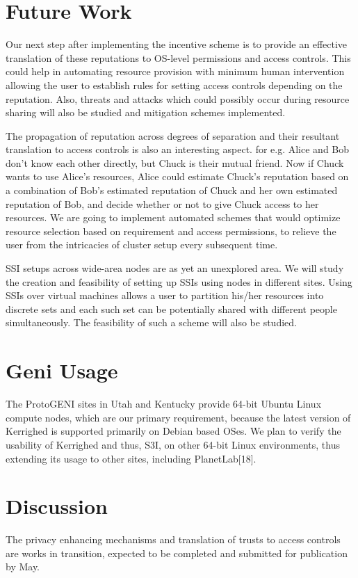 \documentclass[10pt, conference, compsocconf]{IEEEtran}
\begin{document}
\section{Future Work}
\label{sec:Future Work}
Our next step after implementing the incentive scheme
is to provide an effective translation of these reputations
to OS-level permissions and access controls. This could
help in automating resource provision with minimum human
intervention allowing the user to establish rules for
setting access controls depending on the reputation.
Also, threats and attacks which could possibly
occur during resource sharing will also be studied and
mitigation schemes implemented.

The propagation of reputation across degrees of separation
and their resultant translation to access controls is also
an interesting aspect. for e.g. Alice and Bob don’t know
each other directly, but Chuck is their mutual friend.
Now if Chuck wants to use Alice's resources, Alice could
estimate Chuck's reputation based on a combination of
Bob's estimated reputation of Chuck and her own
estimated reputation of Bob, and decide whether or
not to give Chuck access to her resources. We are
going to implement automated schemes that would
optimize resource selection based on requirement and
access permissions, to relieve the user from the
intricacies of cluster setup every subsequent time.

SSI setups across wide-area nodes are as yet an unexplored
area. We will study the creation and feasibility of
setting up SSIs using nodes in different sites. Using
SSIs over virtual machines allows a user to partition
his/her resources into discrete sets and each such set
can be potentially shared with different people
simultaneously. The feasibility of such a scheme
will also be studied.

\section{Geni Usage}
\label{sec:Geni Usage}
The ProtoGENI\cite{protogeni} sites in Utah
and Kentucky provide 64-bit Ubuntu\cite{ubuntu}
Linux compute nodes, which are our primary requirement,
because the latest version of Kerrighed is supported
primarily on Debian\cite{debian} based OSes.
We plan to verify the usability of Kerrighed and thus,
S3I, on other 64-bit Linux environments, thus 
extending its usage to other sites, including PlanetLab[18].

\section{Discussion}
\label{sec:Discussion}
The privacy enhancing mechanisms and translation of trusts
to access controls are works in transition, expected to be
completed and submitted for publication by May.
\end{document}
